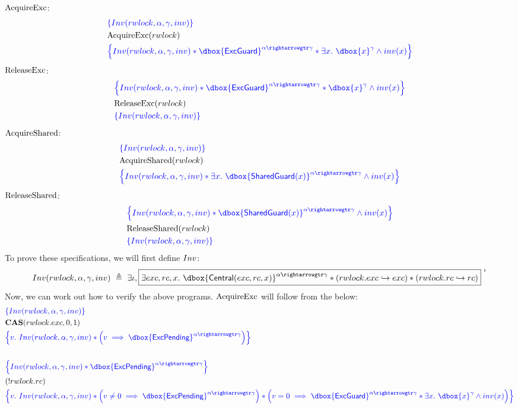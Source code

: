 \documentclass{article}
\newcommand\dboxed[1]{\dbox{\vphantom{t}\ensuremath{#1}}}
\renewcommand{\eqdef}{\triangleq}
\newcommand{\pointsto}{\hookrightarrow}
\newcommand{\refines}{\rightarrowgtr}
\begin{document}
$\text{AcquireExc}$:
\begin{align*}
& \inlinehoare{ \Inv(\rwlock,\alpha,\gamma,\inv) }\\
& \AcquireExc(\rwlock) \\
& \inlinehoare{ \Inv(\rwlock,\alpha,\gamma,\inv) * \dboxed{\ExcGuard}^{\alpha \refines \gamma} * \exists x.~ \dboxed{x}^\gamma \land \inv(x) }
\end{align*}
$\text{ReleaseExc}$:
\begin{align*}
& \inlinehoare{ \Inv(\rwlock,\alpha,\gamma,\inv) * \dboxed{\ExcGuard}^{\alpha \refines \gamma} * \dboxed{x}^\gamma \land \inv(x) }\\
& \ReleaseExc(\rwlock) \\
& \inlinehoare{ \Inv(\rwlock,\alpha,\gamma,\inv) }
\end{align*}
$\text{AcquireShared}$:
\begin{align*}
& \inlinehoare{ \Inv(\rwlock,\alpha,\gamma,\inv) }\\
& \AcquireShared(\rwlock) \\
& \inlinehoare{ \Inv(\rwlock,\alpha,\gamma,\inv) * \exists x.~ \dboxed{\SharedGuard(x)}^{\alpha \refines \gamma} \land \inv(x) }
\end{align*}
$\text{ReleaseShared}$:
\begin{align*}
& \inlinehoare{ \Inv(\rwlock,\alpha,\gamma,\inv) * \dboxed{\SharedGuard(x)}^{\alpha \refines \gamma} \land \inv(x) }\\
& \ReleaseShared(\rwlock) \\
& \inlinehoare{ \Inv(\rwlock,\alpha,\gamma,\inv) }
\end{align*}
To prove these specifications, we will first define $Inv$:
\begin{align*}
  \Inv(\rwlock,\alpha,\gamma,\inv) ~\eqdef~
      \exists \iota, \boxed{
        \exists exc,rc,x .~
            \dboxed{\Central(exc,rc,x)}^{\alpha \refines \gamma}
            * (\rwlock.\exc \pointsto exc)
            * (\rwlock.\rc \pointsto rc)
      }^{~\iota}
\end{align*}
Now, we can work out how to verify the above programs.
$\text{AcquireExc}$ will follow from the below:
\begin{align}
& \inlinehoare{ \Inv(\rwlock,\alpha,\gamma,\inv) } \nonumber \\
& \CAS(\rwlock.\exc,0,1) \nonumber \\ %
& \inlinehoare{v.~
  \Inv(\rwlock,\alpha,\gamma,\inv) *
      \left(v \implies \dboxed{\ExcPending}^{\alpha\refines\gamma}\right) } \nonumber \\
   \nonumber \\
& \inlinehoare{
    \Inv(\rwlock,\alpha,\gamma,\inv) *
    \dboxed{\ExcPending}^{\alpha\refines\gamma} } \nonumber \\
& (!\rwlock.\rc) \nonumber \\
& \inlinehoare{v .~
    \Inv(\rwlock,\alpha,\gamma,\inv) *
    \left(v\ne 0 \implies \dboxed{\ExcPending}^{\alpha\refines\gamma}\right) *
    \left(v=0 \implies \dboxed{\ExcGuard}^{\alpha\refines\gamma} *
        \exists x.~ \dboxed{x}^{\gamma} \land \inv(x)\right)
    } \nonumber
\end{align}
\end{document}

